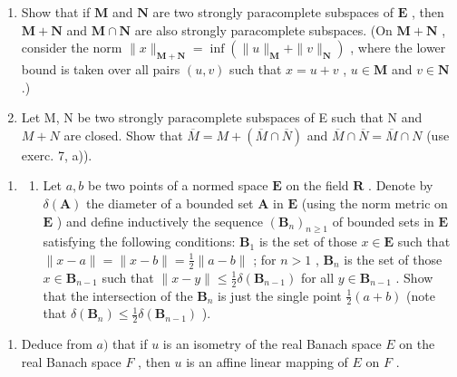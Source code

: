 \begin{enumerate}
\def\labelenumi{\alph{enumi})}
\item
  Show that if \(\mathbf{M}\) and \(\mathbf{N}\) are two strongly paracomplete subspaces of \(\mathbf{E}\) , then \(\mathbf{M} + \mathbf{N}\) and \(\mathbf{M} \cap \mathbf{N}\) are also strongly paracomplete subspaces. (On \(\mathbf{M} + \mathbf{N}\) , consider the norm \(\|x\|_{\mathbf{M} + \mathbf{N}} = \inf (\|u\|_{\mathbf{M}} + \|v\|_{\mathbf{N}})\) , where the lower bound is taken over all pairs \((u, v)\) such that \(x = u + v\) , \(u \in \mathbf{M}\) and \(v \in \mathbf{N}\) .)
\item
  Let M, N be two strongly paracomplete subspaces of E such that N and \(M + N\) are closed. Show that \(\overline{M} = M + (\overline{M} \cap \overline{N})\) and \(\overline{M} \cap \overline{N} = \overline{M} \cap N\) (use exerc. 7, a)).
\end{enumerate}

\begin{enumerate}
\def\labelenumi{\arabic{enumi})}
\setcounter{enumi}{8}
\tightlist
\item
  \begin{enumerate}
  \def\labelenumii{\alph{enumii})}
  \tightlist
  \item
    Let \(a, b\) be two points of a normed space \(\mathbf{E}\) on the field \(\mathbf{R}\) . Denote by \(\delta(\mathbf{A})\) the diameter of a bounded set \(\mathbf{A}\) in \(\mathbf{E}\) (using the norm metric on \(\mathbf{E}\) ) and define inductively the sequence \((\mathbf{B}_n)_{n \geqslant 1}\) of bounded sets in \(\mathbf{E}\) satisfying the following conditions: \(\mathbf{B}_1\) is the set of those \(x \in \mathbf{E}\) such that \(\|x - a\| = \|x - b\| = \frac{1}{2}\|a - b\|\) ; for \(n > 1\) , \(\mathbf{B}_n\) is the set of those \(x \in \mathbf{B}_{n-1}\) such that \(\|x - y\| \leqslant \frac{1}{2}\delta(\mathbf{B}_{n-1})\) for all \(y \in \mathbf{B}_{n-1}\) . Show that the intersection of the \(\mathbf{B}_n\) is just the single point \(\frac{1}{2}(a + b)\) (note that \(\delta(\mathbf{B}_n) \leqslant \frac{1}{2}\delta(\mathbf{B}_{n-1})\) ).
  \end{enumerate}
\end{enumerate}

\begin{enumerate}
\def\labelenumi{\alph{enumi})}
\setcounter{enumi}{1}
\tightlist
\item
  Deduce from \(a)\) that if \(u\) is an isometry of the real Banach space \(E\) on the real Banach space \(F\) , then \(u\) is an affine linear mapping of \(E\) on \(F\) .
\end{enumerate}

